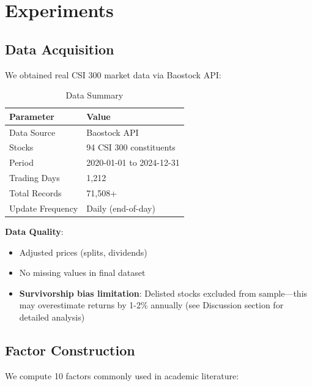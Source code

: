 \section{Experiments}
\label{sec:experiments}

\subsection{Data Acquisition}

We obtained real CSI 300 market data via Baostock API:

\begin{table}[h]
\centering
\caption{Data Summary}
\begin{tabular}{ll}
\toprule
Parameter & Value \\
\midrule
Data Source & Baostock API \\
Stocks & 94 CSI 300 constituents \\
Period & 2020-01-01 to 2024-12-31 \\
Trading Days & 1,212 \\
Total Records & 71,508+ \\
Update Frequency & Daily (end-of-day) \\
\bottomrule
\end{tabular}
\end{table}

\textbf{Data Quality}:
\begin{itemize}
    \item Adjusted prices (splits, dividends)
    \item No missing values in final dataset
    \item \textbf{Survivorship bias limitation}: Delisted stocks excluded from sample---this may overestimate returns by 1-2\% annually (see Discussion section for detailed analysis)
\end{itemize}

\subsection{Factor Construction}

We compute 10 factors commonly used in academic literature:

